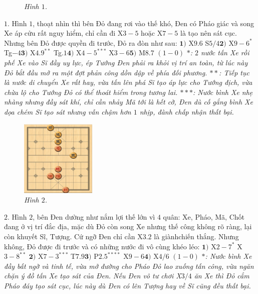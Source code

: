 \begin{multicols}{2}
\begin{figure}[H]
		\caption{\small\textit{\color{gocco}Hình $1$.}}
		\vspace*{-10pt}
	\end{figure} 
	$1.$ Hình $1$, thoạt nhìn thì bên Đỏ đang rơi vào thế khó, Đen có Pháo giác và song Xe áp cửu rất nguy hiểm, chỉ cần đi X$3-5$ hoặc X$7-5$ là tạo nên sát cục. Nhưng bên Đỏ được quyền đi trước, Đỏ ra đòn như sau:
	\vskip 0.05cm
	$\pmb{1)}$ X$9.6$   S$5/4$\quad $\pmb{2)}$ X$9-6^*$ Tg$-4$\quad $\pmb{3)}$ X$4.9^{**}$ Tg$.1$\quad $\pmb{4)}$ X$4-5^{***}$ X$3-6$\quad $\pmb{5)}$ M$8.7$ $(1-0)$
	\vskip 0.05cm
	\textit{$*$: $2$ nước tấn Xe rồi phế Xe vào Sĩ đầy uy lực, ép Tướng Đen phải ra khỏi vị trí an toàn, từ lúc này Đỏ bắt đầu mở ra một đợt phản công  dồn dập về phía đối phương.
		\vskip 0.05cm
		$**$: Tiếp tục là nước di chuyển Xe rất hay, vừa tấn lên phá Sĩ tạo áp lực cho Tướng địch, vừa chừa lộ cho Tướng Đỏ có thể thoát hiểm trong tương lai.
		\vskip 0.05cm
		$***$: Nước bình Xe nhẹ nhàng nhưng đầy sát khí, chỉ cần nhảy Mã tới là hết cờ, Đen dù cố gắng bình Xe dọa chém Sĩ tạo sát nhưng vẫn chậm hơn $1$ nhịp, đành chấp nhận thất bại.}
	\begin{figure}[H]
		\vspace*{-5pt}
		\centering
		\captionsetup{labelformat= empty, justification=centering}
		\includegraphics[width= 0.32\textwidth]{2}
		\caption{\small\textit{\color{gocco}Hình $2$.}}
		\vspace*{-10pt}
	\end{figure}
	$2.$ Hình $2$, bên Đen dường như nắm lợi thế lớn vì $4$ quân: Xe, Pháo, Mã, Chốt đang ở vị trí đắc địa, mặc dù Đỏ còn song Xe nhưng thế công không rõ ràng, lại còn khuyết Sĩ, Tượng. Cứ ngỡ Đen chỉ cần X$3.2$ là giành\linebreak chiến thắng. Nhưng không, Đỏ được đi trước và có những nước đi vô cùng khéo léo:
	\vskip 0.05cm
	$\pmb{1)}$ X$2-7^*$ X$3-8^{**}$ \quad$\pmb{2)}$ X$7-3^{***}$ T$7.9$\quad $\pmb{3)}$ P$2.5^{****}$ X$9-6$\quad $\pmb{4)}$ X$4/6$ $(1-0)$
	\vskip 0.05cm  
	\textit{$*$: Nước bình Xe đầy bất ngờ và tinh tế, vừa mở đường cho Pháo Đỏ lao xuống tấn công, vừa ngăn chặn ý đồ tấn Xe tạo sát của Đen. Nếu Đen vô tư chơi X$3/4$ ăn Xe thì Đỏ cắm Pháo đáy tạo sát cục, lúc này dù Đen có lên Tượng hay về Sĩ cũng đều thất bại.
}
\end{multicols}
